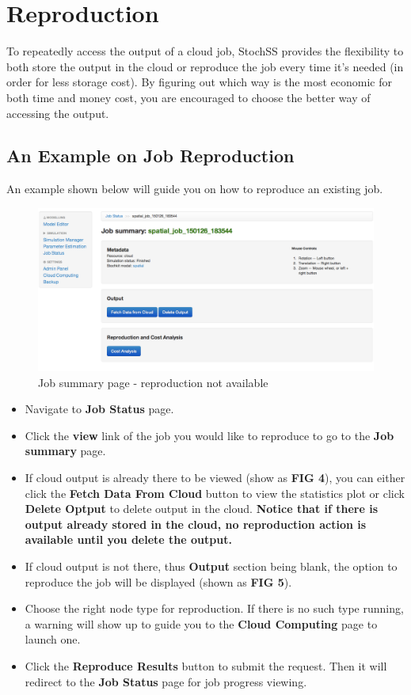 \section{Reproduction}
To repeatedly access the output of a cloud job, StochSS provides the flexibility to both store the output in the cloud or reproduce the job every time it's needed (in order for less storage cost). By figuring out which way is the most economic for both time and money cost, you are encouraged to choose the better way of accessing the output.

\subsection{An Example on Job Reproduction}
An example shown below will guide you on how to reproduce an existing job.

\begin{figure}[!ht]
\centering
\includegraphics[scale=0.35]{T6/T6_fig_reproduction2.png}
\caption{Job summary page - reproduction not available}
\label{fig:2}
\end{figure}

\begin{itemize}
\item Navigate to \textbf{Job Status} page.%
\item Click the \textbf{view} link of the job you would like to reproduce to go to the \textbf{Job summary} page.
\item If cloud output is already there to be viewed (show as \textbf{FIG 4}), you can either click the \textbf{Fetch Data From Cloud} button to view the statistics plot or click \textbf{Delete Optput} to delete output in the cloud. \textbf{Notice that if there is output already stored in the cloud, no reproduction action is available until you delete the output.}
\item If cloud output is not there, thus \textbf{Output} section being blank, the option to reproduce the job will be displayed (shown as \textbf{FIG 5}).
\item Choose the right node type for reproduction. If there is no such type running, a warning will show up to guide you to the \textbf{Cloud Computing} page to launch one.
\item Click the \textbf{Reproduce Results} button to submit the request. Then it will redirect to the \textbf{Job Status} page for job progress viewing.

\end{itemize}

